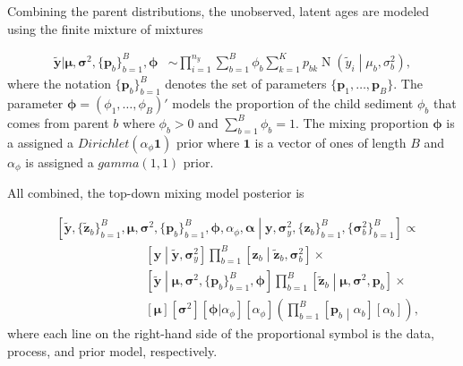 Combining the parent distributions, the unobserved, latent ages are modeled using the finite mixture of mixtures

\begin{align*}
\tilde{\mathbf{y}} | \boldsymbol{\mu}, \boldsymbol{\sigma}^2, \{\boldsymbol{p}_b \}_{b=1}^B, \boldsymbol{\phi} & \sim \prod_{i=1}^{n_y} \sum_{b=1}^B \phi_b \sum_{k=1}^K p_{bk} \operatorname{N} \left( \tilde{y}_i \middle| \mu_{b}, \sigma_{b}^2 \right),
\end{align*}
where the notation $\{\mathbf{p}_b\}_{b=1}^{B}$ denotes the set of parameters $\{ \mathbf{p}_1, \ldots, \mathbf{p}_B\}$. The parameter $\boldsymbol{\phi} = (\phi_1, \ldots, \phi_B)'$ models the proportion of the child sediment $\phi_b$ that comes from parent $b$ where $\phi_b > 0$ and $\sum_{b=1}^B \phi_b = 1$. The mixing proportion $\boldsymbol{\phi}$ is a assigned a $Dirichlet(\alpha_\phi \mathbf{1})$ prior where $\mathbf{1}$ is a vector of ones of length $B$ and $\alpha_\phi$ is assigned a $gamma(1, 1)$ prior. 

All combined, the top-down mixing model posterior is

\begin{align*}
& \left[ \mathbf{\tilde{y}}, \{ \mathbf{\tilde{z}}_b \}_{b=1}^B, \boldsymbol{\mu}, \boldsymbol{\sigma}^2, \{ \boldsymbol{p}_b \}_{b=1}^B, \boldsymbol{\phi}, \alpha_\phi, \boldsymbol{\alpha} \middle| \mathbf{y}, \boldsymbol{\sigma}_y^2, \{ \mathbf{z}_b\}_{b=1}^B, \{\boldsymbol{\sigma}^2_b \}_{b=1}^{B} \right] \propto \\
& \hspace{3cm} \left[\mathbf{y} \middle| \mathbf{\tilde{y}}, \boldsymbol{\sigma}_y^2 \right]
\prod_{b=1}^B \left[\mathbf{z}_b \middle| \mathbf{\tilde{z}}_b, \boldsymbol{\sigma}_b^2 \right] \times \\
& \hspace{3cm} 
\left[ \mathbf{\tilde{y}} \middle| \boldsymbol{\mu}, \boldsymbol{\sigma}^2, \{ \boldsymbol{p}_b \}_{b=1}^B, \boldsymbol{\phi} \right]
\prod_{b=1}^B 
\left[ \mathbf{\tilde{z}}_b \middle| \boldsymbol{\mu}, \boldsymbol{\sigma}^2, \boldsymbol{p}_b \right] \times\\
& \hspace{3cm} 
\left[ \boldsymbol{\mu} \right]
\left[ \boldsymbol{\sigma}^2 \right]
\left[ \boldsymbol{\phi} | \alpha_{\phi} \right]
\left[ \alpha_{\phi} \right]
\left( \prod_{b=1}^B \left[ \boldsymbol{p}_b \middle| \alpha_b \right]
\left[ \alpha_b \right]
 \right),
\end{align*}
where each line on the right-hand side of the proportional symbol is the data, process, and prior model, respectively.

